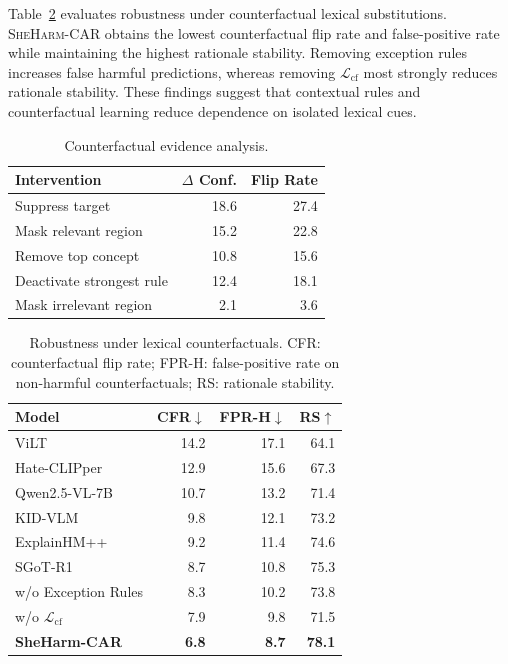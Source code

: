 \documentclass[11pt]{article}
\begin{document}
Table~\ref{tab:lexical-robustness} evaluates robustness under
counterfactual lexical substitutions. \textsc{SheHarm-CAR} obtains
the lowest counterfactual flip rate and false-positive rate while
maintaining the highest rationale stability. Removing exception rules
increases false harmful predictions, whereas removing
$\mathcal{L}_{\mathrm{cf}}$ most strongly reduces rationale
stability. These findings suggest that contextual rules and
counterfactual learning reduce dependence on isolated lexical cues.
\begin{table}[t]
\centering
\small
\setlength{\tabcolsep}{4.5pt}
\renewcommand{\arraystretch}{1.04}
\begin{tabular}{lrr}
\toprule
\textbf{Intervention} &
\textbf{$\Delta$ Conf.} &
\textbf{Flip Rate} \\
\midrule
Suppress target
& 18.6 & 27.4 \\
Mask relevant region
& 15.2 & 22.8 \\
Remove top concept
& 10.8 & 15.6 \\
Deactivate strongest rule
& 12.4 & 18.1 \\
Mask irrelevant region
& 2.1 & 3.6 \\
\bottomrule
\end{tabular}
\caption{Counterfactual evidence analysis.}
\label{tab:counterfactual-analysis}
\end{table}
\begin{table}[t]
\centering
\small
\setlength{\tabcolsep}{4.5pt}
\renewcommand{\arraystretch}{1.04}
\begin{tabular}{lrrr}
\toprule
\textbf{Model} &
\textbf{CFR$\downarrow$} &
\textbf{FPR-H$\downarrow$} &
\textbf{RS$\uparrow$} \\
\midrule
ViLT 
& 14.2 & 17.1 & 64.1 \\

Hate-CLIPper 
& 12.9 & 15.6 & 67.3 \\

Qwen2.5-VL-7B 
& 10.7 & 13.2 & 71.4 \\

KID-VLM 
& 9.8 & 12.1 & 73.2 \\

ExplainHM++ 
& 9.2 & 11.4 & 74.6 \\

SGoT-R1 
& 8.7 & 10.8 & 75.3 \\

w/o Exception Rules
& 8.3 & 10.2 & 73.8 \\

w/o $\mathcal{L}_{\mathrm{cf}}$
& 7.9 & 9.8 & 71.5 \\

\midrule
\textbf{SheHarm-CAR}
& \textbf{6.8}
& \textbf{8.7}
& \textbf{78.1} \\
\bottomrule
\end{tabular}
\caption{Robustness under lexical counterfactuals. CFR: counterfactual
flip rate; FPR-H: false-positive rate on non-harmful counterfactuals;
RS: rationale stability.}
\label{tab:lexical-robustness}
\end{table}
\end{document}
